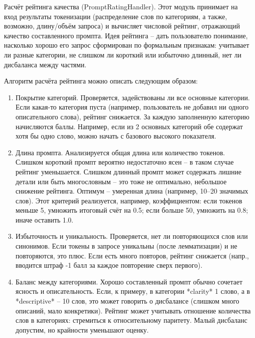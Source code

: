 Расчёт рейтинга качества (PromptRatingHandler). Этот модуль принимает на вход результаты токенизации (распределение слов по категориям, а также, возможно, длину/объём запроса) и вычисляет числовой рейтинг, отражающий качество составленного промпта. Идея рейтинга – дать пользователю понимание, насколько хорошо его запрос сформирован по формальным признакам: учитывает ли разные категории, не слишком ли короткий или избыточно длинный, нет ли дисбаланса между частями.

Алгоритм расчёта рейтинга можно описать следующим образом:
\begin{enumerate}[label=\arabic*.]
\item  Покрытие категорий. Проверяется, задействованы ли все основные категории. Если какая-то категория пуста (например, пользователь не добавил ни одного описательного слова), рейтинг снижается. За каждую заполненную категорию начисляются баллы. Например, если из 2 основных категорий обе содержат хотя бы одно слово, можно начать с базового высокого показателя.
\item Длина промпта. Анализируется общая длина или количество токенов. Слишком короткий промпт вероятно недостаточно ясен – в таком случае рейтинг уменьшается. Слишком длинный промпт может содержать лишние детали или быть многословным – это тоже не оптимально, небольшое снижение рейтинга. Оптимум – умеренная длина (например, 10–20 значимых слов). Этот критерий реализуется, например, коэффициентом: если токенов меньше 5, умножить итоговый счёт на 0.5; если больше 50, умножить на 0.8; иначе оставить 1.0.
\item Избыточность и уникальность. Проверяется, нет ли повторяющихся слов или синонимов. Если токены в запросе уникальны (после лемматизации) и не повторяются, это плюс. Если есть много повторов, рейтинг снижается (напр., вводится штраф -1 балл за каждое повторение сверх первого).
\item Баланс между категориями. Хорошо составленный промпт обычно сочетает ясность и описательность. Если, к примеру, в категории *clarity* 1 слово, а в *descriptive* – 10 слов, это может говорить о дисбалансе (слишком много описаний, мало конкретики). Рейтинг может учитывать отношение количества слов в категориях: стремиться к относительному паритету. Малый дисбаланс допустим, но крайности уменьшают оценку.
\end{enumerate}


